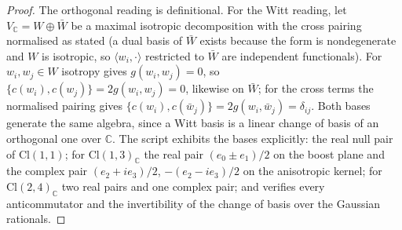 \documentclass[11pt]{article}
\theoremstyle{definition}
\newcommand{\Cl}{\mathrm{Cl}}
\newcommand{\C}{\mathbb{C}}
\newcommand{\ip}[2]{\langle #1, #2\rangle}
\begin{document}
\begin{proof}
The orthogonal reading is definitional. For the Witt reading, let $V_{\C} = W \oplus \bar{W}$ be a maximal isotropic decomposition with the cross pairing normalised as stated (a dual basis of $\bar{W}$ exists because the form is nondegenerate and $W$ is isotropic, so $\ip{w_{i}}{\cdot}$ restricted to $\bar{W}$ are independent functionals). For $w_{i}, w_{j} \in W$ isotropy gives $g(w_{i}, w_{j}) = 0$, so $\{c(w_{i}), c(w_{j})\} = 2g(w_{i}, w_{j}) = 0$, likewise on $\bar{W}$; for the cross terms the normalised pairing gives $\{c(w_{i}), c(\bar{w}_{j})\} = 2g(w_{i}, \bar{w}_{j}) = \delta_{ij}$. Both bases generate the same algebra, since a Witt basis is a linear change of basis of an orthogonal one over $\C$. The script exhibits the bases explicitly: the real null pair of $\Cl(1,1)$; for $\Cl(1,3)_{\C}$ the real pair $(e_{0} \pm e_{1})/2$ on the boost plane and the complex pair $(e_{2} + ie_{3})/2$, $-(e_{2} - ie_{3})/2$ on the anisotropic kernel; for $\Cl(2,4)_{\C}$ two real pairs and one complex pair; and verifies every anticommutator and the invertibility of the change of basis over the Gaussian rationals.
\end{proof}
\end{document}
